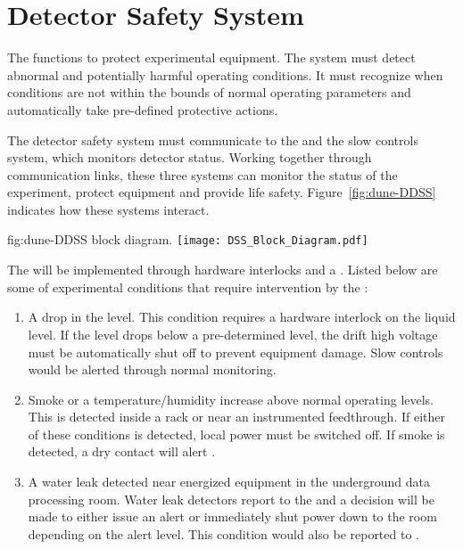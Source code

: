 \section{ Detector Safety System}
\label{sec:fdsp-coord-det-safety}


The  functions to protect experimental equipment.  The
system must detect abnormal and potentially harmful operating
conditions.  It must recognize when conditions are not within the
bounds of normal operating parameters and automatically take
pre-defined protective actions.


The detector safety system must communicate to the \surf {}
and the  slow controls system, which monitors detector
status.  Working together through communication links, these three
systems can monitor the status of the experiment, protect equipment
and provide life safety. Figure~\ref{fig:dune-DDSS} indicates how
these systems interact.
\begin{dunefigure}{fig:dune-DDSS}
  { block diagram.}
  \texttt{[image: DSS\_Block\_Diagram.pdf]}
\end{dunefigure}


The  will be implemented through hardware interlocks and a
.  Listed below are some of  experimental
conditions that require intervention by the :
\begin{enumerate}
 \item A drop in the  level.  This condition requires a hardware
   interlock on the liquid level.  If the level drops below a
   pre-determined level, the drift high voltage must be automatically 
   shut off to prevent equipment damage.  Slow controls would be
   alerted through normal monitoring.
 \item Smoke or a temperature/humidity increase above normal operating
   levels. This is detected inside a rack or near an instrumented
   feedthrough.  If either of these conditions is detected, local
   power must be switched off. If smoke is detected, a
   dry contact will alert .
 \item A water leak detected near energized equipment in the 
   underground data processing room.  Water leak detectors 
   report to the   and a decision will be made to either
   issue an alert or immediately shut power down to the room depending
   on the alert level.  This condition would also be reported
   to .
\end{enumerate}

